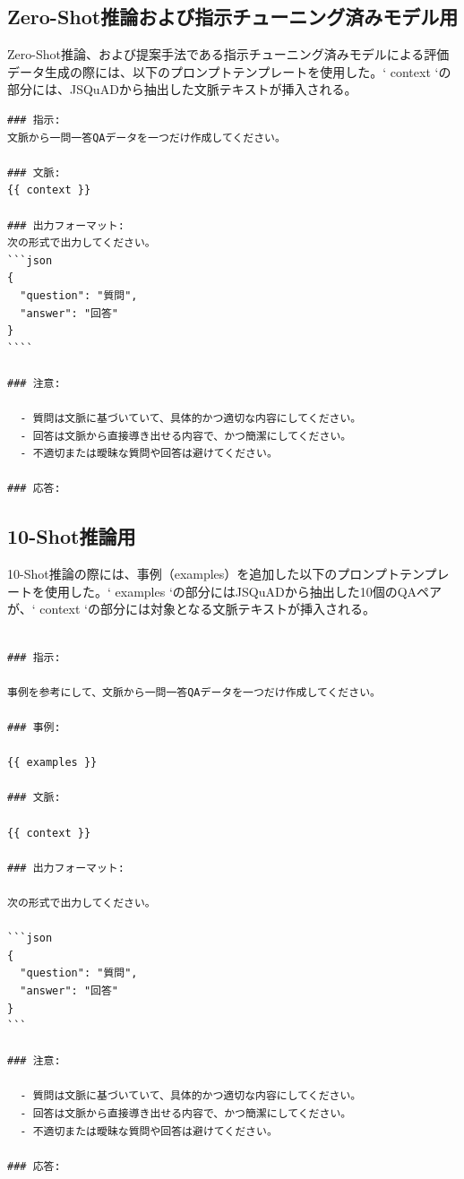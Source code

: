 \documentclass[a4paper,11pt]{jreport}
\begin{document}
\subsection{Zero-Shot推論および指示チューニング済みモデル用}
Zero-Shot推論、および提案手法である指示チューニング済みモデルによる評価データ生成の際には、以下のプロンプトテンプレートを使用した。`{{ context }}`の部分には、JSQuADから抽出した文脈テキストが挿入される。

\begin{screen}
\begin{verbatim}
### 指示:
文脈から一問一答QAデータを一つだけ作成してください。

### 文脈:
{{ context }}

### 出力フォーマット:
次の形式で出力してください。
```json
{
  "question": "質問",
  "answer": "回答"
}
````

### 注意:

  - 質問は文脈に基づいていて、具体的かつ適切な内容にしてください。
  - 回答は文脈から直接導き出せる内容で、かつ簡潔にしてください。
  - 不適切または曖昧な質問や回答は避けてください。

### 応答:

\end{verbatim}
\end{screen}

\subsection{10-Shot推論用}
10-Shot推論の際には、事例（examples）を追加した以下のプロンプトテンプレートを使用した。`{{ examples }}`の部分にはJSQuADから抽出した10個のQAペアが、`{{ context }}`の部分には対象となる文脈テキストが挿入される。

\begin{screen}
\begin{verbatim}

### 指示:

事例を参考にして、文脈から一問一答QAデータを一つだけ作成してください。

### 事例:

{{ examples }}

### 文脈:

{{ context }}

### 出力フォーマット:

次の形式で出力してください。

```json
{
  "question": "質問",
  "answer": "回答"
}
```

### 注意:

  - 質問は文脈に基づいていて、具体的かつ適切な内容にしてください。
  - 回答は文脈から直接導き出せる内容で、かつ簡潔にしてください。
  - 不適切または曖昧な質問や回答は避けてください。

### 応答:

\end{verbatim}
\end{screen}
\end{document}
